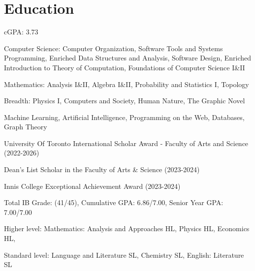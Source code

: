 \documentclass[letterpaper,10pt]{article}
\begin{document}

    \section{Education}

        \begin{resume_list}
            \item cGPA: 3.73
            \vspace{3pt}
            \item Computer Science: Computer Organization, Software Tools and Systems Programming, Enriched Data Structures and Analysis, Software Design, Enriched Introduction to Theory of Computation, Foundations of Computer Science I\&II
            \item Mathematics: Analysis I\&II, Algebra I\&II, Probability and Statistics I, Topology
            \item Breadth: Physics I, Computers and Society, Human Nature, The Graphic Novel
            \vspace{3pt}
            \item Machine Learning, Artificial Intelligence, Programming on the Web, Databases, Graph Theory
            \vspace{3pt}
            \item University Of Toronto International Scholar Award - Faculty of Arts and Science (2022-2026)
            \item Dean’s List Scholar in the Faculty of Arts \& Science (2023-2024)
            \item Innis College Exceptional Achievement Award (2023-2024)
        \end{resume_list}
    \vspace{5pt} 
    \begin{resume_list}
        \item Total IB Grade: (41/45), Cumulative GPA: 6.86/7.00, Senior Year GPA: 7.00/7.00
        \vspace{3pt}
        \item Higher level: Mathematics: Analysis and Approaches HL, 
        Physics HL, Economics HL, 
        \item Standard level: Language and Literature SL, 
        Chemistry SL, English: Literature SL
    \end{resume_list}
\end{document}

